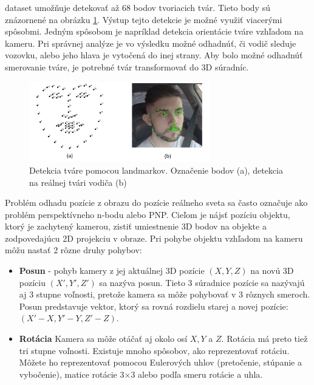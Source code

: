 \documentclass[slovak,master,dept460,male,cpp,cpdeclaration]{diploma}
\begin{document}
dataset  umožňuje detekovať až 68 bodov tvoriacich tvár. Tieto body sú znázornené na obrázku \ref{fig:landmarks}. Výstup tejto detekcie je možné využiť viacerými spôsobmi. Jedným spôsobom je napríklad detekcia orientácie tváre vzhľadom na kameru. Pri správnej analýze je vo výsledku možné odhadnúť, či vodič sleduje vozovku, alebo jeho hlava je vytočená do inej strany. Aby bolo možné odhadnúť smerovanie tváre, je potrebné tvár transformovať do 3D súradníc.

\begin{figure}[H]
	\centering
	\includegraphics[width=0.7\textwidth]{Figures/landmarks.png}
	\caption{Detekcia tváre pomocou landmarkov. Označenie  bodov (a), detekcia na reálnej tvári vodiča (b)}
	\label{fig:landmarks}
\end{figure}


Problém odhadu pozície z obrazu do pozície reálneho sveta sa často označuje ako problém perspektívneho n-bodu alebo PNP. Cieľom je nájsť pozíciu objektu, ktorý je zachytený kamerou, zistiť umiestnenie  3D bodov na objekte a zodpovedajúcu 2D projekciu v obraze. Pri pohybe objektu vzhľadom na kameru môžu nastať 2 rôzne druhy pohybov:
\begin{itemize}
\item\textbf{Posun} - pohyb kamery z jej aktuálnej 3D pozície $(X, Y, Z)$ na novú 3D pozíciu $(X ', Y', Z ')$ sa nazýva posun. Tieto 3 súradnice pozície sa nazývajú aj 3 stupne voľnosti, pretože kamera sa môže pohybovať v 3 rôznych smeroch. Posun predstavuje vektor, ktorý sa rovná rozdielu starej a novej pozície:  $(X '- X, Y' - Y, Z '- Z)$.
\item\textbf{Rotácia}  Kamera sa môže otáčať aj okolo osí $X, Y$ a $Z$. Rotácia má preto tiež tri stupne voľnosti. Existuje mnoho spôsobov, ako reprezentovať rotáciu. Môžete ho reprezentovať pomocou Eulerových uhlov (pretočenie, stúpanie a vybočenie), matice rotácie 3$\times$3 alebo podľa smeru rotácie a uhla.
\end{itemize}
\end{document}

